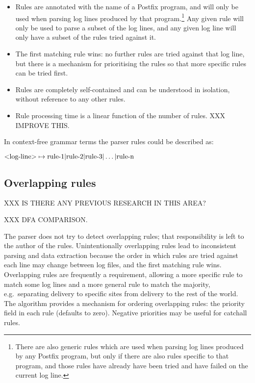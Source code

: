 \begin{itemize}

    \item Rules are annotated with the name of a Postfix program, and will
        only be used when parsing log lines produced by that
        program.\footnote{There are also generic rules which are used when
        parsing log lines produced by any Postfix program, but only if
        there are also rules specific to that program, and those rules have
        already have been tried and have failed on the current log line.}
        Any given rule will only be used to parse a subset of the log
        lines, and any given log line will only have a subset of the rules
        tried against it.

    \item The first matching rule wins: no further rules are tried against
        that log line, but there is a mechanism for prioritising the rules
        so that more specific rules can be tried first.

    \item Rules are completely self-contained and can be understood in
        isolation, without reference to any other rules.

    \item Rule processing time is a linear function of the number of rules.
        XXX IMPROVE THIS\@.

\end{itemize}

\label{comparison against context-free grammars}

In context-free grammar terms the parser rules could be described as:

$\text{\textless{}log-line\textgreater{}} \mapsto \text{rule-1} |
\text{rule-2} | \text{rule-3} | \dots | \text{rule-n}$


\subsection{Overlapping rules}

\label{overlapping rules}

XXX IS THERE ANY PREVIOUS RESEARCH IN THIS AREA\@?

XXX DFA COMPARISON\@.

The parser does not try to detect overlapping rules; that responsibility is
left to the author of the rules.  Unintentionally overlapping rules lead to
inconsistent parsing and data extraction because the order in which rules
are tried against each line may change between log files, and the first
matching rule wins.  Overlapping rules are frequently a requirement,
allowing a more specific rule to match some log lines and a more general
rule to match the majority, e.g.\ separating \SMTP{} delivery to specific
sites from \SMTP{} delivery to the rest of the world.  The algorithm
provides a mechanism for ordering overlapping rules: the priority field in
each rule (defaults to zero).  Negative priorities may be useful for
catchall rules.

